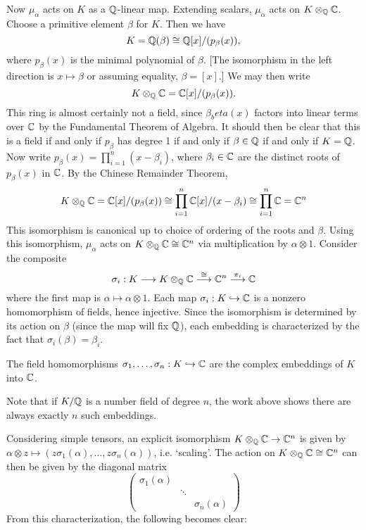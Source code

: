 Now $\mu_\alpha$ acts on $K$ as a $\mathbb{Q}$-linear map. Extending scalars, $\mu_\alpha$ acts on $K \otimes_{\mathbb{Q}} \mathbb{C}$. Choose a primitive element $\beta$ for $K$. Then we have
	\[
	K=\mathbb{Q}(\beta) \cong \mathbb{Q}[x]/ (p_\beta(x)),
	\]
where $p_\beta(x)$ is the minimal polynomial of $\beta$. [The isomorphism in the left direction is $x \mapsto \beta$ or assuming equality, $\beta=[x]$.] We may then write
	\[
	K \otimes_{\mathbb{Q}} \mathbb{C}= \mathbb{C}[x]/(p_\beta(x)).
	\]
This ring is almost certainly not a field, since $\beta_beta(x)$ factors into linear terms over $\mathbb{C}$ by the Fundamental Theorem of Algebra. It should then be clear that this is a field if and only if $p_\beta$ has degree 1 if and only if $\beta \in \mathbb{Q}$ if and only if $K=\mathbb{Q}$. Now write $p_\beta(x)=\prod_{i=1}^n (x-\beta_i)$, where $\beta_i \in \mathbb{C}$ are the distinct roots of $p_\beta(x)$ in $\mathbb{C}$. By the Chinese Remainder Theorem,
	\[
	K \otimes_{\mathbb{Q}} \mathbb{C}= \mathbb{C}[x]/(p_\beta(x)) \cong \prod_{i=1}^n \mathbb{C}[x]/(x-\beta_i) \cong \prod_{i=1}^n \mathbb{C} =\mathbb{C}^n
	\]
This isomorphism is canonical up to choice of ordering of the roots and $\beta$. Using this isomorphism, $\mu_\alpha$ acts on $K \otimes_{\mathbb{Q}} \mathbb{C} \cong \mathbb{C}^n$ via multiplication by $\alpha \otimes 1$. Consider the composite
	\[
	\sigma_i: K \stackrel{}{\longrightarrow} K \otimes_{\mathbb{Q}} \mathbb{C} \stackrel{\cong}{\longrightarrow} \mathbb{C}^n \stackrel{\pi_i}{\longrightarrow} \mathbb{C}
	\]
where the first map is $\alpha \mapsto \alpha \otimes 1$. Each map $\sigma_i: K \hookrightarrow \mathbb{C}$ is a nonzero homomorphism of fields, hence injective. Since the isomorphism is determined by its action on $\beta$ (since the map will fix $\mathbb{Q}$), each embedding is characterized by the fact that $\sigma_i(\beta)=\beta_i$. 

\begin{dfn}
The field homomorphisms $\sigma_1,\ldots,\sigma_n: K \hookrightarrow \mathbb{C}$ are the complex embeddings of $K$ into $\mathbb{C}$.
\end{dfn}

\begin{rem}
Note that if $K/\mathbb{Q}$ is a number field of degree $n$, the work above shows there are always exactly $n$ such embeddings. 
\end{rem}

Considering simple tensors, an explicit isomorphism $K \otimes_{\mathbb{Q}} \mathbb{C} \to \mathbb{C}^n$ is given by $\alpha \otimes z \mapsto (z\sigma_1(\alpha),\ldots,z\sigma_n(\alpha))$, i.e. `scaling'. The action on $K \otimes_{\mathbb{Q}} \mathbb{C} \cong \mathbb{C}^n$ can then be given by the diagonal matrix
	\[
	\begin{pmatrix}
	\sigma_1(\alpha) & & \\
	& \ddots & \\
	& & \sigma_n(\alpha)
	\end{pmatrix}
	\]
From this characterization, the following becomes clear:

